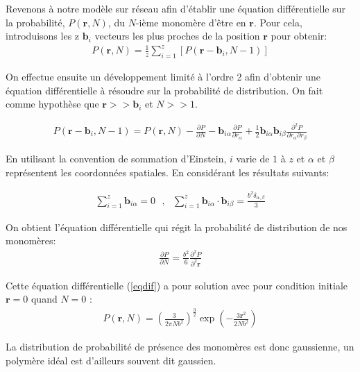 \documentclass[a4paper,11pt]{article}
\begin{document}
Revenons à notre modèle sur réseau afin d'établir une équation différentielle sur la probabilité, $P(\textbf{r},N)$, du $N$-ième monomère d'être en $\textbf{r}$. Pour cela, introduisons les z $\textbf{b}_i$  vecteurs les plus proches de la position $\textbf{r}$ pour obtenir:
\begin{eqnarray}
P(\textbf{r},N)= \frac{1}{z}\sum_{i=1}^{z} \left[P(\textbf{r}-\textbf{b}_i,N-1)\right]
\label{eqdifprob}
\end{eqnarray}

On effectue ensuite un développement limité à l'ordre 2 afin d'obtenir une équation différentielle à résoudre sur la probabilité de distribution. On fait comme hypothèse que $\textbf{r}>>\textbf{b}_i$ et $N >> 1$.

\begin{eqnarray}
P(\textbf{r}-\textbf{b}_i,N-1)=P(\textbf{r},N)- \frac{\partial P}{\partial N}-  \textbf{b}_{i\alpha} \frac{\partial P}{\partial r_{\alpha} } + \frac12 \textbf{b}_{i\alpha}\textbf{b}_{i\beta} \frac{\partial ^2 P}{\partial r_{\alpha}\partial r_{\beta} }
\end{eqnarray}

En utilisant la convention de sommation d'Einstein, $i$ varie de $1$ à $z$ et $\alpha$ et $\beta$ représentent les coordonnées spatiales. En considérant les résultats suivants:

\begin{eqnarray}
\sum_{i=1}^{z}\textbf{b}_{i\alpha}=0 \text{ },\text{ } \sum_{i=1}^{z}\textbf{b}_{i\alpha}\cdot\textbf{b}_{i\beta} = \frac{b^2\delta_{\alpha,\beta}}{3}
\end{eqnarray}

On obtient l'équation différentielle qui régit la probabilité de distribution de nos monomères:
\begin{eqnarray}
 \frac{\partial P}{\partial N} =   \frac{b^2}{6}\frac{\partial ^2 P}{\partial ^2 \textbf{r}}
 \label{eqdif}
\end{eqnarray}

Cette équation différentielle (\ref{eqdif}) a pour solution avec pour condition initiale $\textbf{r}=0$ quand $N=0$ :
\begin{eqnarray}
P(\textbf{r},N)=\left(\frac{3}{2\pi N b^2}\right)^\frac{3}{2}\exp\left(-\frac{3\textbf{r}^2}{2 N b^2}\right)
\end{eqnarray}

La distribution de probabilité de présence des monomères est donc gaussienne, un polymère idéal est d'ailleurs souvent dit gaussien.\\
\end{document}
